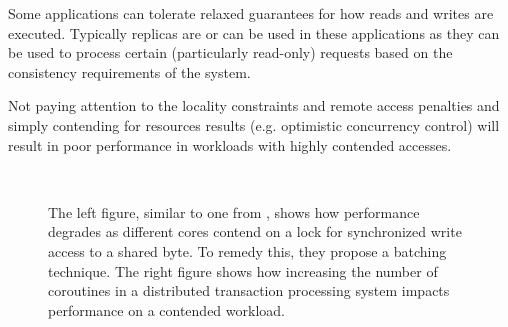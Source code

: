 Some applications can tolerate relaxed guarantees for how reads and writes are
executed. 
Typically replicas are or can be used in these applications as they can be
used to process certain (particularly read-only) requests based on the
consistency requirements of the system.

Not paying attention to the locality constraints and remote access penalties
and simply contending for resources results (e.g. optimistic concurrency
control) will result in poor performance in workloads with highly contended
accesses.

\begin{figure}[hbt!]


%
~%
%
%

\caption{
    The left figure, similar to one from \cite{boyd2014oplog}, shows how
    performance degrades as different cores contend on a lock for synchronized
    write access to a shared byte. To remedy this, they propose a batching
    technique. The right figure shows how increasing
    the number of coroutines in a distributed transaction processing system
    \cite{kalia2016fasst} impacts performance on a contended workload.
      }
\label{fig:contention_penalty}

\end{figure}

